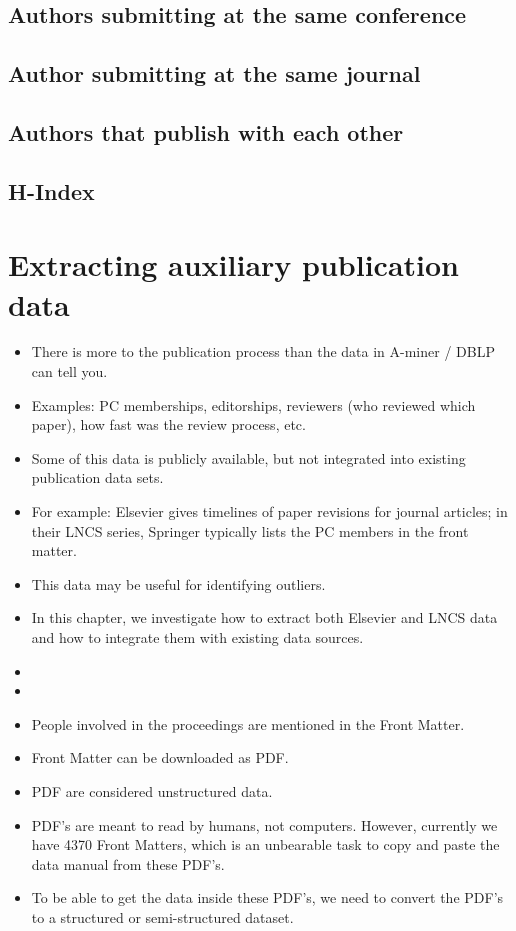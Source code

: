 \documentclass{ou-report}
\begin{document}
\section{Authors submitting at the same conference}

\section{Author submitting at the same journal}

\section{Authors that publish with each other}

\section{H-Index}


\chapter{Extracting auxiliary publication data}
\begin{itemize}
    \item There is more to the publication process than the data
        in A-miner / DBLP can tell you.
    \item Examples: PC memberships, editorships, reviewers (who reviewed which paper),
        how fast was the review process, etc.
    \item Some of this data is publicly available, but not integrated into existing
        publication data sets.
    \item For example: Elsevier gives timelines of paper revisions for journal articles;
        in their LNCS series, Springer typically lists the PC members in the front matter.
    \item This data may be useful for identifying outliers.
    \item In this chapter, we investigate how to extract both Elsevier and LNCS data and
        how to integrate them with existing data sources.
    \item
    \item 
    \item People involved in the proceedings are mentioned in the Front Matter.
    \item Front Matter can be downloaded as PDF.
    \item PDF are considered unstructured data.
    \item PDF's are meant to read by humans, not computers. However, currently 
        we have 4370 Front Matters, which is an unbearable task to copy and 
        paste the data manual from these PDF's.
    \item To be able to get the data inside these PDF's, we need to convert the 
        PDF's to a structured or semi-structured dataset.
\end{itemize}
\end{document}
